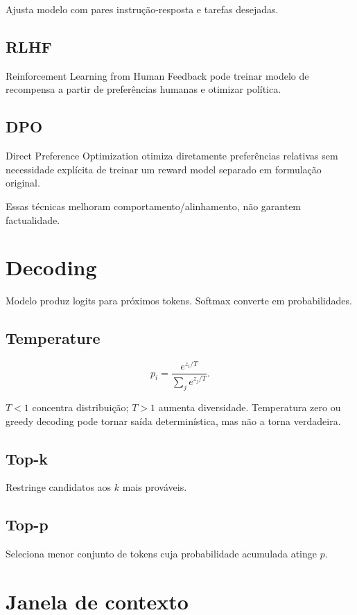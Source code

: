 Ajusta modelo com pares instrução-resposta e tarefas desejadas.

\subsection{RLHF}

Reinforcement Learning from Human Feedback pode treinar modelo de recompensa a partir de preferências humanas e otimizar política.

\subsection{DPO}

Direct Preference Optimization otimiza diretamente preferências relativas sem necessidade explícita de treinar um reward model separado em formulação original.

Essas técnicas melhoram comportamento/alinhamento, não garantem factualidade.

\section{Decoding}

Modelo produz logits para próximos tokens. Softmax converte em probabilidades.

\subsection{Temperature}

\[
p_i=\frac{e^{z_i/T}}{\sum_j e^{z_j/T}}.
\]

$T<1$ concentra distribuição; $T>1$ aumenta diversidade. Temperatura zero ou greedy decoding pode tornar saída determinística, mas não a torna verdadeira.

\subsection{Top-k}

Restringe candidatos aos $k$ mais prováveis.

\subsection{Top-p}

Seleciona menor conjunto de tokens cuja probabilidade acumulada atinge $p$.

\section{Janela de contexto}


